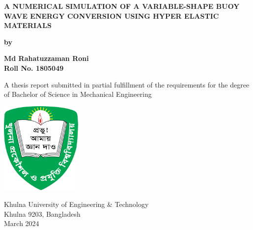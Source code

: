 \documentclass{article}
\newcommand{\Titlethesis}[1]{\centering\fontsize{14}{16}\bfseries\MakeUppercase{#1}}
\newcommand{\Stuname}[1]{\centering\fontsize{12}{14}\bfseries #1}
\newcommand{\Degree}[1]{\centering\fontsize{12}{14}\selectfont #1}
\begin{document}
\begin{titlepage}
    \centering
    {\Titlethesis{A Numerical Simulation of a Variable-Shape Buoy Wave Energy
Conversion using Hyper Elastic Materials} \par}
    
    \vspace{3\baselineskip}
    
    {\fontsize{14}{16}\Stuname{by} \par}
    
    \vspace{3\baselineskip}
    
    {\fontsize{14}{16}\Stuname{Md Rahatuzzaman Roni\\ Roll No. 1805049} \par}
    
    \vspace{4\baselineskip}
    
    {\Degree{A thesis report submitted in partial fulfillment of the requirements for the degree of Bachelor of Science in Mechanical Engineering} \par}
    
    \vspace{5\baselineskip}
    
    \includegraphics[width=0.3\textwidth]{logo.png} %
    
    \vspace{5\baselineskip}
    
    {\Degree{Khulna University of Engineering \& Technology \\
    Khulna 9203, Bangladesh \\
    March 2024} \par}
    
\end{titlepage}
\clearpage
\end{document}
